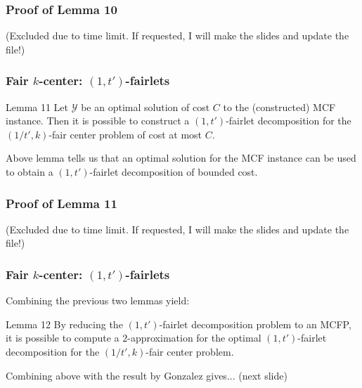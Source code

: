 \documentclass{beamer}
\begin{document}


\begin{frame}
\frametitle{Proof of Lemma 10}

(Excluded due to time limit. If requested, I will make the slides and update the file!)
\end{frame}



\begin{frame}
\frametitle{Fair $k$-center: $(1, t')$-fairlets}

\begin{block}{Lemma 11}
Let $\mathcal{Y}$ be an optimal solution of cost $C$ to the (constructed) MCF instance. Then it is possible to construct a $(1, t')$-fairlet decomposition for the $(1/t', k)$-fair center problem of cost at most $C$.

\end{block}

Above lemma tells us that an optimal solution for the MCF instance can be used to obtain a $(1, t')$-fairlet decomposition of bounded cost.

\end{frame}



\begin{frame}
\frametitle{Proof of Lemma 11}

(Excluded due to time limit. If requested, I will make the slides and update the file!)
\end{frame}



\begin{frame}
\frametitle{Fair $k$-center: $(1, t')$-fairlets}

Combining the previous two lemmas yield:
 
\begin{block}{Lemma 12}
By reducing the $(1, t')$-fairlet decomposition problem to an MCFP, it is possible to compute a $2$-approximation for the optimal $(1, t')$-fairlet decomposition for the $(1/t', k)$-fair center problem.
\end{block}

Combining above with the result by Gonzalez gives... (next slide)

\end{frame}
\end{document}
